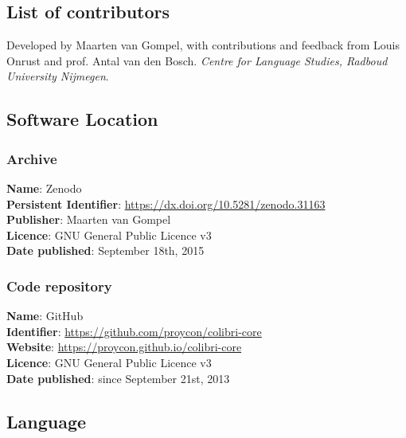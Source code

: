 \documentclass[a4paper,12pt]{article}
\begin{document}
\subsection{List of contributors}

Developed by Maarten van Gompel, with contributions and feedback from Louis
Onrust and prof. Antal van den Bosch. \emph{Centre for Language Studies, Radboud
University Nijmegen}.

\subsection{Software Location}

\subsubsection{Archive}

\begin{addmargin}[2em]{2em}
\textbf{Name}: Zenodo \\
\textbf{Persistent Identifier}: \url{https://dx.doi.org/10.5281/zenodo.31163} \\
\textbf{Publisher}: Maarten van Gompel \\
\textbf{Licence}: GNU General Public Licence v3 \\
\textbf{Date published}: September 18th, 2015 \\
\end{addmargin}

\subsubsection{Code repository}

\begin{addmargin}[2em]{2em}
\textbf{Name}: GitHub \\
\textbf{Identifier}: \url{https://github.com/proycon/colibri-core} \\
\textbf{Website}: \url{https://proycon.github.io/colibri-core} \\
\textbf{Licence}: GNU General Public Licence v3 \\
\textbf{Date published}: since September 21st, 2013 \\
\end{addmargin}

\subsection{Language}
\end{document}
